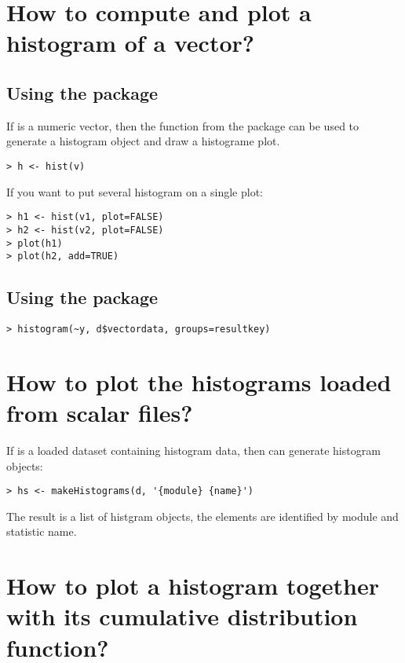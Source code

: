 \section{How to compute and plot a histogram of a vector?}

\subsection{Using the  package}

If  is a numeric vector, then the  function from the  package
can be used to generate a histogram object and draw a histograme plot.

\begin{verbatim}
> h <- hist(v)
\end{verbatim}

If you want to put several histogram on a single plot:

\begin{verbatim}
> h1 <- hist(v1, plot=FALSE)
> h2 <- hist(v2, plot=FALSE)
> plot(h1)
> plot(h2, add=TRUE)
\end{verbatim}

\subsection{Using the  package}

\begin{verbatim}
> histogram(~y, d$vectordata, groups=resultkey)
\end{verbatim}

\section{How to plot the histograms loaded from scalar files?}

If  is a loaded dataset containing histogram data, then  can generate
histogram objects:

\begin{verbatim}
> hs <- makeHistograms(d, '{module} {name}') 
\end{verbatim}

The result is a list of histgram objects, the elements are identified by module and statistic name.

\section{How to plot a histogram together with its cumulative distribution function?}

